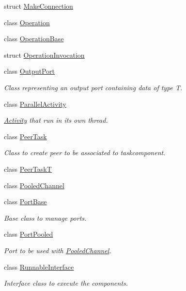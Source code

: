 \begin{DoxyCompactItemize}
struct \hyperlink{structcoco_1_1_make_connection}{Make\+Connection}
\item 
class \hyperlink{classcoco_1_1_operation}{Operation}
\item 
class \hyperlink{classcoco_1_1_operation_base}{Operation\+Base}
\item 
struct \hyperlink{structcoco_1_1_operation_invocation}{Operation\+Invocation}
\item 
class \hyperlink{classcoco_1_1_output_port}{Output\+Port}
\begin{DoxyCompactList}\small\item\em Class representing an output port containing data of type T. \end{DoxyCompactList}\item 
class \hyperlink{classcoco_1_1_parallel_activity}{Parallel\+Activity}
\begin{DoxyCompactList}\small\item\em \hyperlink{classcoco_1_1_activity}{Activity} that run in its own thread. \end{DoxyCompactList}\item 
class \hyperlink{classcoco_1_1_peer_task}{Peer\+Task}
\begin{DoxyCompactList}\small\item\em Class to create peer to be associated to taskcomponent. \end{DoxyCompactList}\item 
class \hyperlink{classcoco_1_1_peer_task_t}{Peer\+Task\+T}
\item 
class \hyperlink{classcoco_1_1_pooled_channel}{Pooled\+Channel}
\item 
class \hyperlink{classcoco_1_1_port_base}{Port\+Base}
\begin{DoxyCompactList}\small\item\em Base class to manage ports. \end{DoxyCompactList}\item 
class \hyperlink{classcoco_1_1_port_pooled}{Port\+Pooled}
\begin{DoxyCompactList}\small\item\em Port to be used with \hyperlink{classcoco_1_1_pooled_channel}{Pooled\+Channel}. \end{DoxyCompactList}\item 
class \hyperlink{classcoco_1_1_runnable_interface}{Runnable\+Interface}
\begin{DoxyCompactList}\small\item\em Interface class to execute the components. \end{DoxyCompactList}\item 

\end{DoxyCompactItemize}
